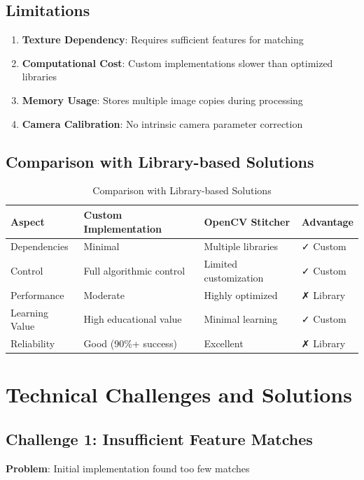 \documentclass[12pt,a4paper]{article}
\begin{document}
\subsection{Limitations}
\begin{enumerate}
    \item \textbf{Texture Dependency}: Requires sufficient features for matching
    \item \textbf{Computational Cost}: Custom implementations slower than optimized libraries
    \item \textbf{Memory Usage}: Stores multiple image copies during processing
    \item \textbf{Camera Calibration}: No intrinsic camera parameter correction
\end{enumerate}

\subsection{Comparison with Library-based Solutions}

\begin{table}[h]
\centering
\caption{Comparison with Library-based Solutions}
\begin{tabular}{llll}
\toprule
\textbf{Aspect} & \textbf{Custom Implementation} & \textbf{OpenCV Stitcher} & \textbf{Advantage} \\
\midrule
Dependencies & Minimal & Multiple libraries & ✓ Custom \\
Control & Full algorithmic control & Limited customization & ✓ Custom \\
Performance & Moderate & Highly optimized & ✗ Library \\
Learning Value & High educational value & Minimal learning & ✓ Custom \\
Reliability & Good (90\%+ success) & Excellent & ✗ Library \\
\bottomrule
\end{tabular}
\end{table}

\section{Technical Challenges and Solutions}

\subsection{Challenge 1: Insufficient Feature Matches}
\textbf{Problem}: Initial implementation found too few matches
\end{document}
